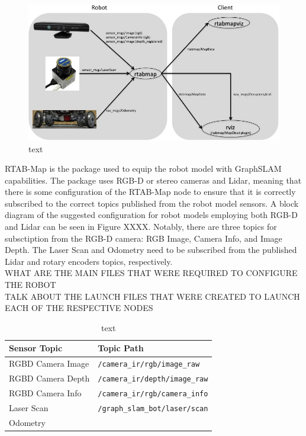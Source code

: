 \documentclass[a4paper]{article}
\begin{document}
\begin{figure}[h]
	\centering
	\includegraphics[scale=0.5]{rtabmap_setup}
	\caption{text}
\end{figure}

\newpage

RTAB-Map is the package used to equip the robot model with GraphSLAM capabilities. The package uses RGB-D or stereo cameras and Lidar, meaning that there is some configuration of the RTAB-Map node to ensure that it is correctly subscribed to the correct topics published from the robot model sensors. A block diagram of the suggested configuration for robot models employing both RGB-D and Lidar can be seen in Figure XXXX. Notably, there are three topics for subsctiption from the RGB-D camera: RGB Image, Camera Info, and Image Depth. The Laser Scan and Odometry need to be subscribed from the published Lidar and rotary encoders topics, respectively.\\

WHAT ARE THE MAIN FILES THAT WERE REQUIRED TO CONFIGURE THE ROBOT\\

TALK ABOUT THE LAUNCH FILES THAT WERE CREATED TO LAUNCH EACH OF THE RESPECTIVE NODES

\begin{table}[h]
	\centering
	\caption{text}
	\begin{tabular}{ll}
		\toprule
		\textbf{Sensor Topic} & \textbf{Topic Path} \\
		\midrule
		RGBD Camera Image & \texttt{/camera\_ir/rgb/image\_raw} \\
		RGBD Camera Depth & \texttt{/camera\_ir/depth/image\_raw} \\
		RGBD Camera Info & \texttt{/camera\_ir/rgb/camera\_info} \\
		Laser Scan & \texttt{/graph\_slam\_bot/laser/scan} \\
		Odometry & \texttt{} \\ 
		\bottomrule
	\end{tabular}
\end{table}
\end{document}
